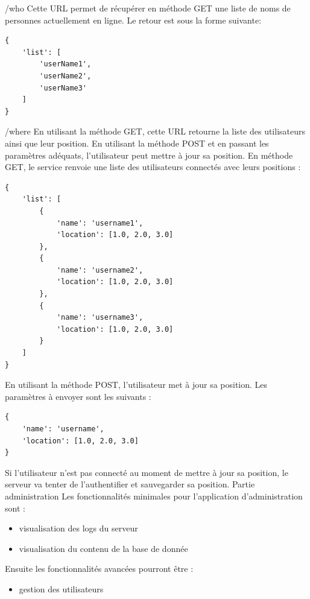 /who
Cette URL permet de récupérer en méthode GET une liste de noms de personnes actuellement en ligne. Le retour est sous la forme suivante:
\lstset{language=Javascript}
\begin{lstlisting}[caption=Corps de la requête who]
{
    'list': [
        'userName1',
        'userName2',
        'userName3'
    ]
}
\end{lstlisting}

/where
En utilisant la méthode GET, cette URL retourne la liste des utilisateurs ainsi que leur position. En utilisant la méthode POST et en passant les paramètres adéquats, l'utilisateur peut mettre à jour sa position.
En méthode GET, le service renvoie une liste des utilisateurs connectés avec leurs positions :
\lstset{language=Javascript}
\begin{lstlisting}[caption=Corps de la requête where GET]
{
    'list': [
        {
            'name': 'username1',
            'location': [1.0, 2.0, 3.0]
        },
        {
            'name': 'username2',
            'location': [1.0, 2.0, 3.0]
        },
        {
            'name': 'username3',
            'location': [1.0, 2.0, 3.0]
        }
    ]
}
\end{lstlisting}

En utilisant la méthode POST, l'utilisateur met à jour sa position. Les paramètres à envoyer sont les suivants :

\lstset{language=Javascript}
\begin{lstlisting}[caption=Corps de la requête where POST]
{
    'name': 'username',
    'location': [1.0, 2.0, 3.0]
}
\end{lstlisting}

Si l'utilisateur n'est pas connecté au moment de mettre à jour sa position, le serveur va tenter de l'authentifier et sauvegarder sa position.
Partie administration
Les fonctionnalités minimales pour l'application d'administration sont :
\begin{itemize}
    \item visualisation des logs du serveur
    \item visualisation du contenu de la base de donnée
\end{itemize}

Ensuite les fonctionnalités avancées pourront être :
\begin{itemize}
    \item gestion des utilisateurs
\end{itemize}


